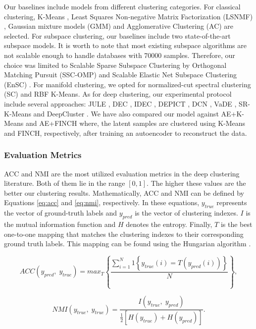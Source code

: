 \documentclass{article}
\begin{document}
Our baselines include models from different clustering categories. For classical clustering,  
K-Means \cite{paper14}, Least Squares Non-negative Matrix Factorization (LSNMF) \cite{paper75}, Gaussian mixture models (GMM) \cite{paper47} and Agglomerative Clustering (AC) \cite{paper74} are selected. For subspace clustering, our baselines include two state-of-the-art subspace models. It is worth to note that most existing subspace algorithms are not scalable enough to handle databases with 70000 samples. Therefore, our choice was limited to Scalable Sparse Subspace Clustering by Orthogonal Matching Pursuit (SSC-OMP) \cite{paper78} and Scalable Elastic Net Subspace Clustering (EnSC) \cite{paper79}. For manifold clustering, we opted for normalized-cut spectral clustering (SC) \cite{paper76} and RBF K-Means\cite{paper77}.
As for deep clustering, our experimental protocol include several approaches: JULE \cite{paper22}, DEC \cite{paper27}, IDEC \cite{paper28}, DEPICT \cite{paper36}, DCN \cite{paper29}, VaDE \cite{paper35}, SR-K-Means\cite{paper73} and DeepCluster \cite{paper24}. We have also compared our model against AE+K-Means and AE+FINCH where, the latent samples are clustered using K-Means and FINCH, respectively, after training an autoencoder to reconstruct the data.

\subsubsection{Evaluation Metrics}
ACC \cite{paper41} and NMI \cite{paper42} are the most utilized evaluation metrics in the deep clustering literature. Both of them lie in the range $[0, 1]$. The higher these values are the better our clustering results. Mathematically, ACC and NMI can be defined by Equations \ref{eq:acc} and \ref{eq:nmi}, respectively. In these equations, $y_{true}$ represents the vector of ground-truth labels and $y_{pred}$ is the vector of clustering indexes. $I$ is the mutual information function and $H$ denotes the entropy. Finally, $T$ is the best one-to-one mapping that matches the clustering indexes to their corresponding ground truth labels. This mapping can be found using the Hungarian algorithm \cite{paper43}.

\begin{equation}\label{eq:acc}
    ACC(y_{pred}, \;y_{true}) = max_{T}\left \{ \frac{\sum_{i=1}^{N} 1 \left \{ y_{true}(i)=T(y_{pred}(i)) \right \} }{N}  \right \},
\end{equation}

\begin{equation}\label{eq:nmi}
    NMI(y_{true}, \; y_{true}) = \frac{I(y_{true}, \; y_{pred})}{\frac{1}{2}[H(y_{true}) + H(y_{pred})]}.   
\end{equation}
\end{document}
